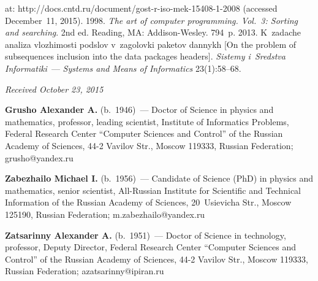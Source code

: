 \begin{multicols}{2}
{{\begin{thebibliography}{9}
\columnbreak

\noindent
 at: 
{\sf http://docs.cntd.ru/document/gost-r-iso-mek-15408-1-2008}
(accessed December~11, 2015).
   1998. \textit{The art of computer programming. Vol.~3: 
  Sorting and 
searching}. 2nd ed. Reading, MA: Addison-Wesley. 794~p.
 2013. K~zadache analiza vlozhimosti podslov 
v~zagolovki paketov dannykh [On the problem of subsequences inclusion into the data 
packages headers]. \textit{Sistemy i~Sredstva Informatiki}~---
\textit{Systems and Means of Informatics} 23(1):58--68.
 \end{thebibliography}

 }
 }

\end{multicols}

\vspace*{-3pt}

\hfill{\small\textit{Received October 23, 2015}}
    
    
\Contr

\noindent
\textbf{Grusho Alexander A.} (b.\ 1946)~--- Doctor of Science in physics and 
mathematics, professor, leading scientist, Institute of Informatics Problems, 
Federal Research Center ``Computer Sciences and Control'' of the Russian Academy 
of Sciences, 44-2 Vavilov 
    Str., Moscow 119333, Russian Federation;
grusho@yandex.ru 

\vspace*{3pt}

\noindent
\textbf{Zabezhailo Michael I.} (b.\ 1956)~--- Candidate of Science (PhD) in 
physics and mathematics, senior scientist, All-Russian Institute for Scientific 
and Technical Information of the Russian Academy of Sciences, 20~Usievicha Str., 
Moscow 125190, Russian Federation; m.zabezhailo@yandex.ru

\vspace*{3pt}

\noindent
\textbf{Zatsarinny Alexander A.} (b.\ 1951)~--- Doctor of Science in 
technology, professor, Deputy Director, Federal Research Center ``Computer 
Sciences and Control'' of the Russian Academy of Sciences, 44-2 Vavilov 
    Str., Moscow 119333, Russian Federation;
azatsarinny@ipiran.ru
    
\label{end\stat}


\renewcommand{\bibname}{\protect\rm Литература}

 
 
 
 